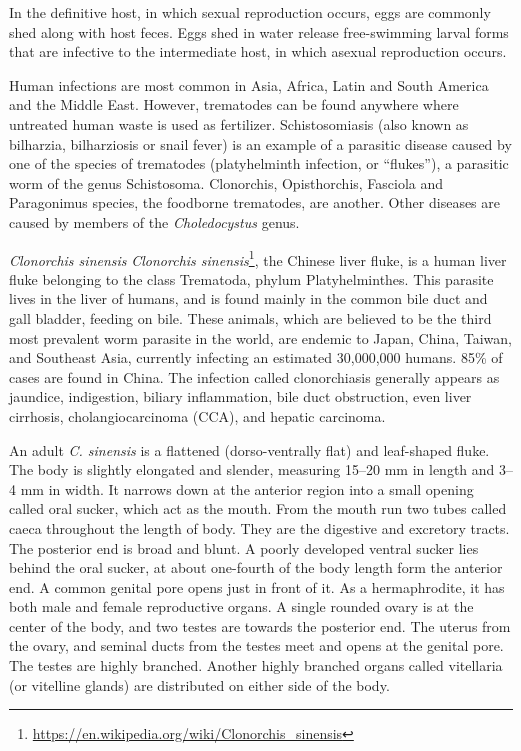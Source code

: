\documentclass[]{book}
\let\rmarkdownfootnote\footnote%
\def\footnote{\protect\rmarkdownfootnote}
\renewcommand{\href}[2]{#2\footnote{\url{#1}}}
\begin{document}
In the definitive host, in which sexual reproduction occurs, eggs are commonly shed along with host feces. Eggs shed in water release free-swimming larval forms that are infective to the intermediate host, in which asexual reproduction occurs.

Human infections are most common in Asia, Africa, Latin and South America and the Middle East. However, trematodes can be found anywhere where untreated human waste is used as fertilizer. Schistosomiasis (also known as bilharzia, bilharziosis or snail fever) is an example of a parasitic disease caused by one of the species of trematodes (platyhelminth infection, or ``flukes''), a parasitic worm of the genus Schistosoma. Clonorchis, Opisthorchis, Fasciola and Paragonimus species, the foodborne trematodes, are another. Other diseases are caused by members of the \emph{Choledocystus} genus.

\emph{Clonorchis sinensis}
\href{https://en.wikipedia.org/wiki/Clonorchis_sinensis}{\emph{Clonorchis sinensis}}, the Chinese liver fluke, is a human liver fluke belonging to the class Trematoda, phylum Platyhelminthes. This parasite lives in the liver of humans, and is found mainly in the common bile duct and gall bladder, feeding on bile. These animals, which are believed to be the third most prevalent worm parasite in the world, are endemic to Japan, China, Taiwan, and Southeast Asia, currently infecting an estimated 30,000,000 humans. 85\% of cases are found in China. The infection called clonorchiasis generally appears as jaundice, indigestion, biliary inflammation, bile duct obstruction, even liver cirrhosis, cholangiocarcinoma (CCA), and hepatic carcinoma.

An adult \emph{C. sinensis} is a flattened (dorso-ventrally flat) and leaf-shaped fluke. The body is slightly elongated and slender, measuring 15--20 mm in length and 3--4 mm in width. It narrows down at the anterior region into a small opening called oral sucker, which act as the mouth. From the mouth run two tubes called caeca throughout the length of body. They are the digestive and excretory tracts. The posterior end is broad and blunt. A poorly developed ventral sucker lies behind the oral sucker, at about one-fourth of the body length form the anterior end. A common genital pore opens just in front of it. As a hermaphrodite, it has both male and female reproductive organs. A single rounded ovary is at the center of the body, and two testes are towards the posterior end. The uterus from the ovary, and seminal ducts from the testes meet and opens at the genital pore. The testes are highly branched. Another highly branched organs called vitellaria (or vitelline glands) are distributed on either side of the body.
\end{document}
